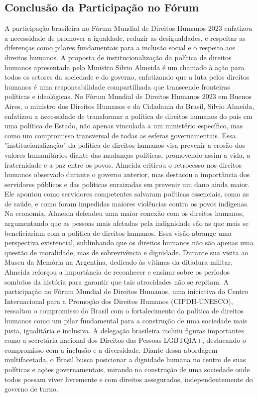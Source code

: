 \documentclass[
   article,       
   12pt,          
   oneside,       
   a4paper,       
   english,       
   brazil,        
   sumario=tradicional
   ]{abntex2}
\begin{document}
\subsection{Conclusão da Participação no Fórum}
A participação brasileira no Fórum Mundial de Direitos Humanos 2023 enfatizou a necessidade de promover a igualdade, reduzir as desigualdades, e respeitar as diferenças como pilares fundamentais para a inclusão social e o respeito aos direitos humanos. A proposta de institucionalização da política de direitos humanos apresentada pelo Ministro Silvio Almeida é um chamado à ação para todos os setores da sociedade e do governo, enfatizando que a luta pelos direitos humanos é uma responsabilidade compartilhada que transcende fronteiras políticas e ideológicas.
No Fórum Mundial de Direitos Humanos 2023 em Buenos Aires, o ministro dos Direitos Humanos e da Cidadania do Brasil, Silvio Almeida, enfatizou a necessidade de transformar a política de direitos humanos do país em uma política de Estado, não apenas vinculada a um ministério específico, mas como um compromisso transversal de todas as esferas governamentais. Essa "institucionalização" da política de direitos humanos visa prevenir a erosão dos valores humanitários diante das mudanças políticas, promovendo assim a vida, a fraternidade e a paz entre os povos. Almeida criticou o retrocesso nos direitos humanos observado durante o governo anterior, mas destacou a importância dos servidores públicos e das políticas enraizadas em prevenir um dano ainda maior. Ele apontou como servidores competentes salvaram políticas essenciais, como as de saúde, e como foram impedidas maiores violências contra os povos indígenas. Na economia, Almeida defendeu uma maior conexão com os direitos humanos, argumentando que as pessoas mais afetadas pela indignidade são as que mais se beneficiariam com a política de direitos humanos. Essa visão abrange uma perspectiva existencial, sublinhando que os direitos humanos não são apenas uma questão de moralidade, mas de sobrevivência e dignidade. Durante sua visita ao Museu da Memória na Argentina, dedicado às vítimas da ditadura militar, Almeida reforçou a importância de reconhecer e ensinar sobre os períodos sombrios da história para garantir que tais atrocidades não se repitam. A participação no Fórum Mundial de Direitos Humanos, uma iniciativa do Centro Internacional para a Promoção dos Direitos Humanos (CIPDH-UNESCO), ressaltou o compromisso do Brasil com o fortalecimento da política de direitos humanos como um pilar fundamental para a construção de uma sociedade mais justa, igualitária e inclusiva. A delegação brasileira incluiu figuras importantes como a secretária nacional dos Direitos das Pessoas LGBTQIA+, destacando o compromisso com a inclusão e a diversidade. Diante dessa abordagem multifacetada, o Brasil busca posicionar a dignidade humana no centro de suas políticas e ações governamentais, mirando na construção de uma sociedade onde todos possam viver livremente e com direitos assegurados, independentemente do governo de turno.
\end{document}
